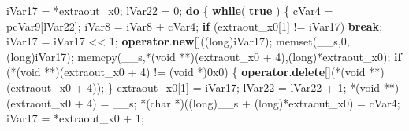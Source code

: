 \documentclass[
]{article}
\newenvironment{Shaded}{}{}
\newcommand{\BaseNTok}[1]{\textcolor[rgb]{0.25,0.63,0.44}{#1}}
\newcommand{\ControlFlowTok}[1]{\textcolor[rgb]{0.00,0.44,0.13}{\textbf{#1}}}
\newcommand{\DataTypeTok}[1]{\textcolor[rgb]{0.56,0.13,0.00}{#1}}
\newcommand{\DecValTok}[1]{\textcolor[rgb]{0.25,0.63,0.44}{#1}}
\newcommand{\KeywordTok}[1]{\textcolor[rgb]{0.00,0.44,0.13}{\textbf{#1}}}
\newcommand{\NormalTok}[1]{#1}
\newcommand{\OperatorTok}[1]{\textcolor[rgb]{0.40,0.40,0.40}{#1}}
\begin{document}
\begin{Shaded}
\begin{Highlighting}[]
\NormalTok{    iVar17 }\OperatorTok{=} \OperatorTok{*}\NormalTok{extraout\_x0}\OperatorTok{;}
\NormalTok{    lVar22 }\OperatorTok{=} \DecValTok{0}\OperatorTok{;}
    \ControlFlowTok{do} \OperatorTok{\{}
      \ControlFlowTok{while}\OperatorTok{(} \KeywordTok{true} \OperatorTok{)} \OperatorTok{\{}
\NormalTok{        cVar4 }\OperatorTok{=}\NormalTok{ pcVar9}\OperatorTok{[}\NormalTok{lVar22}\OperatorTok{];}
\NormalTok{        iVar8 }\OperatorTok{=}\NormalTok{ iVar8 }\OperatorTok{+}\NormalTok{ cVar4}\OperatorTok{;}
        \ControlFlowTok{if} \OperatorTok{(}\NormalTok{extraout\_x0}\OperatorTok{[}\DecValTok{1}\OperatorTok{]} \OperatorTok{!=}\NormalTok{ iVar17}\OperatorTok{)} \ControlFlowTok{break}\OperatorTok{;}
\NormalTok{        iVar17 }\OperatorTok{=}\NormalTok{ iVar17 }\OperatorTok{\textless{}\textless{}} \DecValTok{1}\OperatorTok{;}
        \KeywordTok{operator}\OperatorTok{.}\KeywordTok{new}\OperatorTok{[]((}\DataTypeTok{long}\OperatorTok{)}\NormalTok{iVar17}\OperatorTok{);}
\NormalTok{        memset}\OperatorTok{(}\NormalTok{\_\_s}\OperatorTok{,}\DecValTok{0}\OperatorTok{,(}\DataTypeTok{long}\OperatorTok{)}\NormalTok{iVar17}\OperatorTok{);}
\NormalTok{        memcpy}\OperatorTok{(}\NormalTok{\_\_s}\OperatorTok{,*(}\DataTypeTok{void} \OperatorTok{**)(}\NormalTok{extraout\_x0 }\OperatorTok{+} \DecValTok{4}\OperatorTok{),(}\DataTypeTok{long}\OperatorTok{)*}\NormalTok{extraout\_x0}\OperatorTok{);}
        \ControlFlowTok{if} \OperatorTok{(*(}\DataTypeTok{void} \OperatorTok{**)(}\NormalTok{extraout\_x0 }\OperatorTok{+} \DecValTok{4}\OperatorTok{)} \OperatorTok{!=} \OperatorTok{(}\DataTypeTok{void} \OperatorTok{*)}\BaseNTok{0x0}\OperatorTok{)} \OperatorTok{\{}
          \KeywordTok{operator}\OperatorTok{.}\KeywordTok{delete}\OperatorTok{[](*(}\DataTypeTok{void} \OperatorTok{**)(}\NormalTok{extraout\_x0 }\OperatorTok{+} \DecValTok{4}\OperatorTok{));}
        \OperatorTok{\}}
\NormalTok{        extraout\_x0}\OperatorTok{[}\DecValTok{1}\OperatorTok{]} \OperatorTok{=}\NormalTok{ iVar17}\OperatorTok{;}
\NormalTok{        lVar22 }\OperatorTok{=}\NormalTok{ lVar22 }\OperatorTok{+} \DecValTok{1}\OperatorTok{;}
        \OperatorTok{*(}\DataTypeTok{void} \OperatorTok{**)(}\NormalTok{extraout\_x0 }\OperatorTok{+} \DecValTok{4}\OperatorTok{)} \OperatorTok{=}\NormalTok{ \_\_s}\OperatorTok{;}
        \OperatorTok{*(}\DataTypeTok{char} \OperatorTok{*)((}\DataTypeTok{long}\OperatorTok{)}\NormalTok{\_\_s }\OperatorTok{+} \OperatorTok{(}\DataTypeTok{long}\OperatorTok{)*}\NormalTok{extraout\_x0}\OperatorTok{)} \OperatorTok{=}\NormalTok{ cVar4}\OperatorTok{;}
\NormalTok{        iVar17 }\OperatorTok{=} \OperatorTok{*}\NormalTok{extraout\_x0 }\OperatorTok{+} \DecValTok{1}\OperatorTok{;}

\end{Highlighting}
\end{Shaded}
\end{document}

